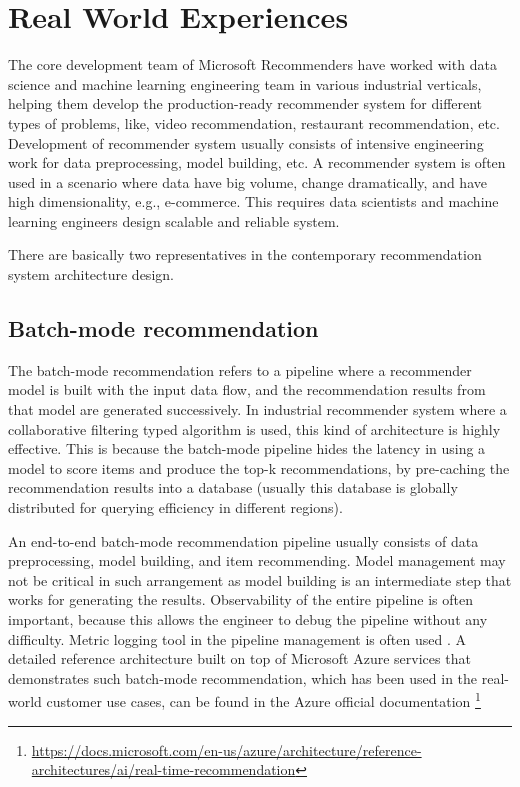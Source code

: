 \section{Real World Experiences} %
The core development team of Microsoft Recommenders have worked with data science and machine learning engineering team in various industrial verticals, helping them develop the production-ready recommender system for different types of problems, like, video recommendation, restaurant recommendation, etc. Development of recommender system usually consists of intensive engineering work for data preprocessing, model building, etc. A recommender system is often used in a scenario where data have big volume, change dramatically, and have high dimensionality, e.g., e-commerce. This requires data scientists and machine learning engineers design scalable and reliable system. 

There are basically two representatives in the contemporary recommendation system architecture design.

\subsection{Batch-mode recommendation}
The batch-mode recommendation refers to a pipeline where a recommender model is built with the input data flow, and the recommendation results from that model are generated successively. In industrial recommender system where a collaborative filtering typed algorithm is used, this kind of architecture is highly effective. This is because the batch-mode pipeline hides the latency in using a model to score items and produce the top-k recommendations, by pre-caching the recommendation results into a database (usually this database is globally distributed for querying efficiency in different regions). 

An end-to-end batch-mode recommendation pipeline usually consists of data preprocessing, model building, and item recommending. Model management may not be critical in such arrangement as model building is an intermediate step that works for generating the results. Observability of the entire pipeline is often important, because this allows the engineer to debug the pipeline without any difficulty. Metric logging tool in the pipeline management is often used \cite{zaharia2018accelerating}. A detailed reference architecture built on top of Microsoft Azure services that demonstrates such batch-mode recommendation, which has been used in the real-world customer use cases, can be found in the Azure official documentation \footnote{\url{https://docs.microsoft.com/en-us/azure/architecture/reference-architectures/ai/real-time-recommendation}}

